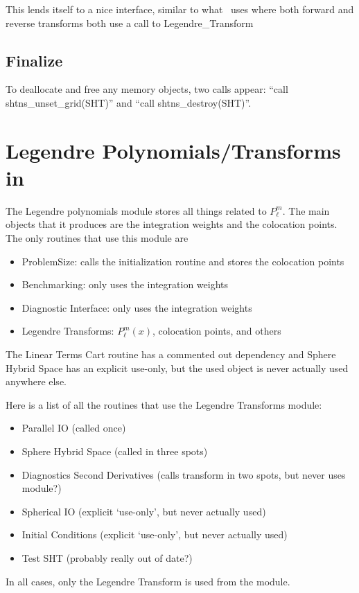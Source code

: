 \documentclass[10pt,letterpaper]{article}
\begin{document}
This lends itself to a nice interface, similar to what \rayleigh\ uses where both
forward and reverse transforms both use a call to Legendre\_Transform


\subsection{Finalize \shtns}
To deallocate and free any memory objects, two calls appear:
``call shtns\_unset\_grid(SHT)'' and ``call shtns\_destroy(SHT)''.

\section{Legendre Polynomials/Transforms in \rayleigh}
The Legendre polynomials module stores all things related to $P_\ell^m$. The main objects
that it produces are the integration weights and the colocation points. The only
routines that use this module are
\begin{itemize}
  \item ProblemSize: calls the initialization routine and stores the colocation points
  \item Benchmarking: only uses the integration weights
  \item Diagnostic Interface: only uses the integration weights
  \item Legendre Transforms: $P_\ell^m(x)$, colocation points, and others
\end{itemize}
The Linear Terms Cart routine has a commented out dependency and Sphere Hybrid Space has
an explicit use-only, but the used object is never actually used anywhere else.

Here is a list of all the routines that use the Legendre Transforms module:
\begin{itemize}
  \item Parallel IO (called once)
  \item Sphere Hybrid Space (called in three spots)
  \item Diagnostics Second Derivatives (calls transform in two spots, but never uses module?)
  \item Spherical IO (explicit `use-only', but never actually used)
  \item Initial Conditions (explicit `use-only', but never actually used)
  \item Test SHT (probably really out of date?)
\end{itemize}
In all cases, only the Legendre Transform is used from the module.
\end{document}
